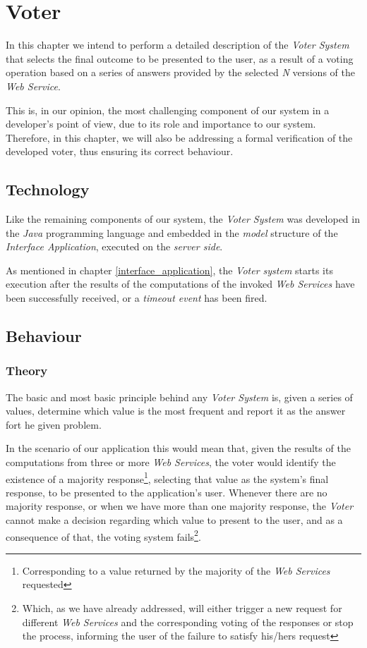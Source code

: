 \chapter{Voter}
\label{voter}

In this chapter we intend to perform a detailed description of the \emph{Voter System} that selects the final outcome to be presented to the user, as a result of a voting operation based on a series of answers provided by the selected \emph{N} versions of the \emph{Web Service}.

This is, in our opinion, the most challenging component of our system in a developer's point of view, due to its role and importance to our system. Therefore, in this chapter, we will also be addressing a formal verification of the developed voter, thus ensuring its correct behaviour.

\section{Technology}

Like the remaining components of our system, the \emph{Voter System} was developed in the \emph{Java} programming language and embedded in the \emph{model} structure of the \emph{Interface Application}, executed on the \emph{server side}.

As mentioned in chapter \ref{interface_application}, the \emph{Voter system} starts its execution after the results of the computations of the invoked \emph{Web Services} have been successfully received, or a \emph{timeout event} has been fired.

\section{Behaviour}

\subsection{Theory}

The basic and most basic principle behind any \emph{Voter System} is, given a series of values, determine which value is the most frequent and report it as the answer fort he given problem.

In the scenario of our application this would mean that, given the results of the computations from three or more \emph{Web Services}, the voter would identify the existence of a majority response\footnote{Corresponding to a value returned by the majority of the \emph{Web Services} requested}, selecting that value as the system's final response, to be presented to the application's user. Whenever there are no majority response, or when we have more than one majority response, the \emph{Voter} cannot make a decision regarding which value to present to the user, and as a consequence of that, the voting system fails\footnote{Which, as we have already addressed, will either trigger a new request for different \emph{Web Services} and the corresponding voting of the responses or stop the process, informing the user of the failure to satisfy his/hers request}.


